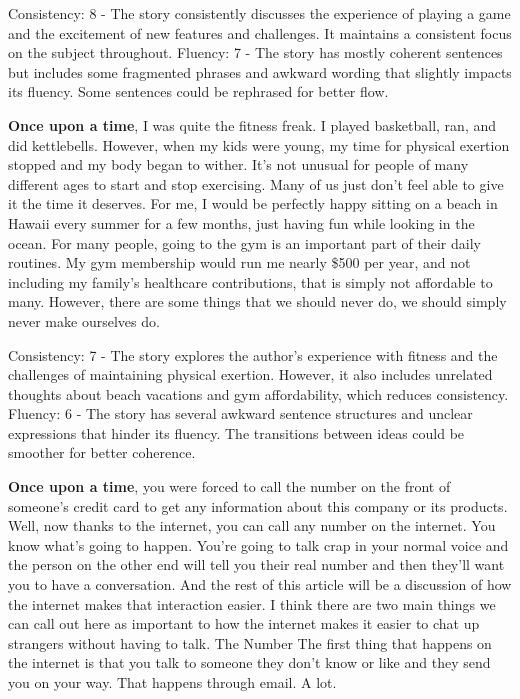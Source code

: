 \documentclass{article}
\begin{document}
Consistency: 8 - The story consistently discusses the experience of playing a game and the excitement of new features and challenges. It maintains a consistent focus on the subject throughout.
Fluency: 7 - The story has mostly coherent sentences but includes some fragmented phrases and awkward wording that slightly impacts its fluency. Some sentences could be rephrased for better flow.

\textbf{Once upon a time}, I was quite the fitness freak. I played basketball, ran, and did kettlebells. However, when my kids were young, my time for physical exertion stopped and my body began to wither. It's not unusual for people of many different ages to start and stop exercising. Many of us just don't feel able to give it the time it deserves. For me, I would be perfectly happy sitting on a beach in Hawaii every summer for a few months, just having fun while looking in the ocean. For many people, going to the gym is an important part of their daily routines. My gym membership would run me nearly \$500 per year, and not including my family's healthcare contributions, that is simply not affordable to many. However, there are some things that we should never do, we should simply never make ourselves do.

Consistency: 7 - The story explores the author's experience with fitness and the challenges of maintaining physical exertion. However, it also includes unrelated thoughts about beach vacations and gym affordability, which reduces consistency.
Fluency: 6 - The story has several awkward sentence structures and unclear expressions that hinder its fluency. The transitions between ideas could be smoother for better coherence.

\textbf{Once upon a time}, you were forced to call the number on the front of someone's credit card to get any information about this company or its products. Well, now thanks to the internet, you can call any number on the internet. You know what's going to happen. You're going to talk crap in your normal voice and the person on the other end will tell you their real number and then they'll want you to have a conversation. And the rest of this article will be a discussion of how the internet makes that interaction easier. I think there are two main things we can call out here as important to how the internet makes it easier to chat up strangers without having to talk. The Number The first thing that happens on the internet is that you talk to someone they don't know or like and they send you on your way. That happens through email. A lot.
\end{document}

